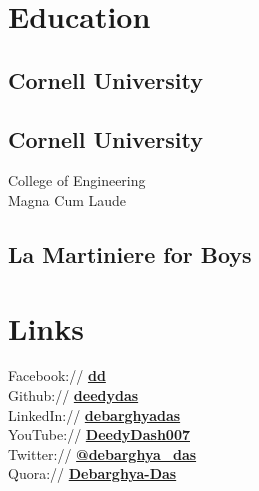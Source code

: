 \documentclass[]{deedy-resume-openfont}
\begin{document}
%
%
\lastupdated

%
%

%
%

\begin{minipage}[t]{0.33\textwidth}


\section{Education}

\subsection{Cornell University}
\sectionsep

\subsection{Cornell University}
College of Engineering \\
Magna Cum Laude\\
\sectionsep

\subsection{La Martiniere for Boys}
\sectionsep


\section{Links}
Facebook:// \href{https://facebook/dd}{\bf dd} \\
Github:// \href{https://github.com/deedydas}{\bf deedydas} \\
LinkedIn://  \href{https://www.linkedin.com/in/debarghyadas}{\bf debarghyadas} \\
YouTube://  \href{https://www.youtube.com/user/DeedyDash007}{\bf DeedyDash007} \\
Twitter://  \href{https://twitter.com/debarghya_das}{\bf @debarghya\_das} \\
Quora://  \href{https://www.quora.com/Debarghya-Das}{\bf Debarghya-Das}


\end{minipage}
\end{document}
